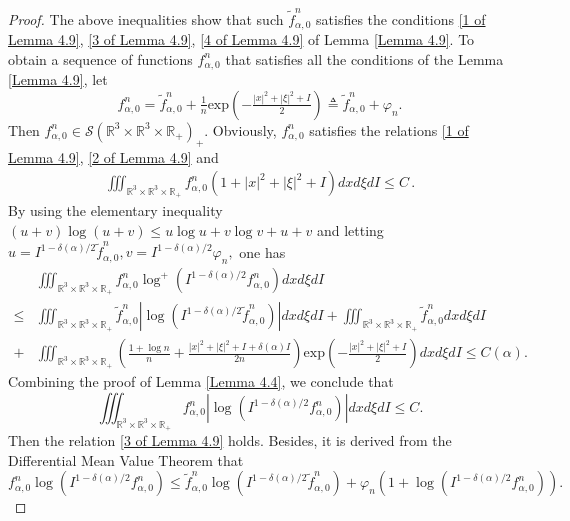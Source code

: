 \documentclass[reqno,11pt]{amsart}
\numberwithin{equation}{section}
\def\R{\mathbb{R}}
\def\exp{\mathrm{exp}}
\begin{document}
\begin{proof}
The above inequalities show that such $\tilde{f}^n_{\alpha,0}$ satisfies the conditions \eqref{1 of Lemma 4.9}, \eqref{3 of Lemma 4.9}, \eqref{4 of Lemma 4.9} of Lemma \ref{Lemma 4.9}. To obtain a sequence of functions $f^n_{\alpha, 0}$ that satisfies all the conditions of the Lemma \ref{Lemma 4.9}, let
 \begin{equation*}
	f^n_{\alpha,0 } = \tilde{f}^n_{\alpha,0 } + \tfrac{1}{n} \exp (-\tfrac{|x|^2 +|\xi|^2 + I} {2}) \triangleq \tilde{f}^n_{\alpha,0 } + \varphi_n.
\end{equation*}
Then $f^n_{\alpha,0 } \in \mathscr{S} (\R^3 \times \R^3 \times \R_+)_+$. Obviously, $f^n_{\alpha,0 }$ satisfies the relations \eqref{1 of Lemma 4.9}, \eqref{2 of Lemma 4.9} and
\begin{equation*}
  \begin{aligned}
    \iiint_{\R^3 \times \R^3 \times \R_+ } f^n_{\alpha,0 } (1+|x|^2 +|\xi|^2 + I )dxd\xi dI \leq C \,.
  \end{aligned}
\end{equation*} 
By using the elementary inequality $ (u+v) \log (u+v ) \leq u \log u + v \log v + u+ v $ and letting $u=I^{1-\delta(\alpha)/2} \tilde{f}^n_{\alpha,0}, v = I^{1- \delta(\alpha)/2} \varphi_n,$ one has
\begin{equation*}
	\begin{aligned}
		&\iiint_{\R^3 \times \R^3 \times \R_+ } f^n_{\alpha,0 } \log ^+ (I^{1-\delta(\alpha)/2}f^n_{\alpha,0 } )dxd\xi dI \\
		\leq & \iiint_{\R^3 \times \R^3 \times \R_+ } \tilde{f}^n_{\alpha,0 } |\log (I^{ 1-\delta(\alpha)/2} \tilde{f}^n_{\alpha,0 } )| dxd\xi dI 
		+ \iiint_{\R^3 \times \R^3 \times \R_+ } \tilde{f}^n_{\alpha,0 } dxd\xi dI \\
		+& \iiint_{\R^3 \times \R^3 \times \R_+ } (\tfrac{1+\log n}{n} +\tfrac{|x|^2 +|\xi|^2 + I + \delta(\alpha) I} {2n} )
		\exp (-\tfrac{|x|^2 +|\xi|^2 + I} {2}) dxd\xi dI \leq C (\alpha ).
	\end{aligned}
\end{equation*}
Combining the proof of Lemma \ref{Lemma 4.4}, we conclude that 
\begin{equation*}
	\iiint_{\R^3 \times \R^3 \times \R_+ } f^n_{\alpha,0 } |\log  (I^{1-\delta(\alpha)/2} f^n_{\alpha,0 } )| dxd\xi dI \leq C.
\end{equation*}	
Then the relation \eqref{3 of Lemma 4.9} holds. Besides, it is derived from the Differential Mean Value Theorem that
\begin{equation*}
	f^n_{\alpha,0} \log (I^{1-\delta(\alpha)/2} f^n_{\alpha,0}) \leq \tilde{f}^n_{\alpha,0} \log (I^{1-\delta(\alpha)/2} \tilde{f}^n_{\alpha,0}) +\varphi_n ( 1 + \log ( I^{1-\delta(\alpha)/2} {f}^n_{\alpha,0} ) ) .

\end{equation*}
\end{proof}
\end{document}
